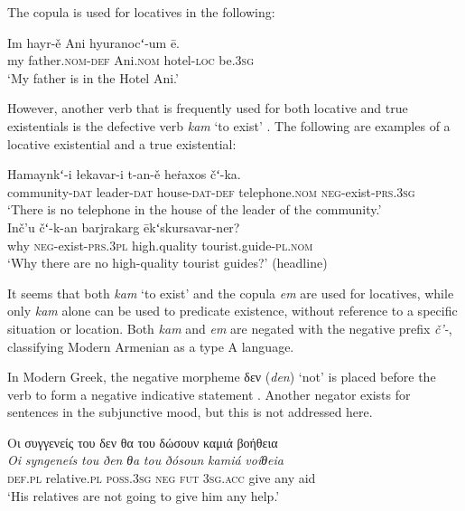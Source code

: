 \documentclass[output=paper,colorlinks,citecolor=brown]{langscibook}
\begin{document}
\begin{paperappendix}
\begin{unindented}
The copula is used for locatives in the following:
%
\begin{exe}\ex \gll Im hayr-ě Ani hyuranocʻ-um ē.  \\
my father.\textsc{nom}-\textsc{def} Ani.\textsc{nom} hotel-\textsc{loc} be.\textsc{3sg} \\
    \glt `My father is in the Hotel Ani.' \parencite[382]{DumTragut2009}
    \end{exe}

However, another verb that is frequently used for both locative and true
existentials is the defective verb \textit{kam} `to exist' \parencite[282]{DumTragut2009}. The following are examples of a locative existential and a true existential:
%
\begin{exe}\ex \gll Hamaynkʻ-i łekavar-i t-an-ě heṙaxos čʻ-ka.  \\
community-\textsc{dat} leader-\textsc{dat} house-\textsc{dat-def} 
telephone.\textsc{nom} \textsc{neg}-exist-\textsc{prs.3sg} \\
    \glt `There is no telephone in the house of the leader of the
community.' \\
\parencite[104--105]{DumTragut2009}
\ex \gll Inč’u čʻ-k-an barjrakarg ēkʻskursavar-ner?  \\
why \textsc{neg}-exist-\textsc{prs.3pl} high.quality tourist.guide-\textsc{pl.nom} \\
    \glt `Why there are no high-quality tourist guides?' (headline)
\parencite[693]{DumTragut2009}
    \end{exe}

It seems that both \textit{kam} `to exist' and the copula \textit{em} are used for locatives, while only \textit{kam} alone can be used to predicate existence, without reference to a specific situation or location. Both \textit{kam} and \textit{em} are negated with the negative prefix \textit{č’-}, classifying Modern Armenian as a type A language. 


In Modern Greek, the negative morpheme δεν
(\textit{den}) `not' is placed before the verb to form a negative
indicative statement \parencite[510]{HoltonMackridge2012}. Another negator exists for sentences in the subjunctive mood, but this is not addressed here. 
%
\begin{exe}\ex \glll
Οι συγγενείς του δεν θα του δώσουν καμιά βοήθεια \\
\textit{Oi} \textit{syngeneís} \textit{tou} \textit{ðen} \textit{θa} \textit{tou} \textit{ðósoun} \textit{kamiá} \textit{voíθeia}\\
\textsc{def.pl}  relative.\textsc{pl} \textsc{poss.3sg} \textsc{neg}  \textsc{fut} \textsc{3sg.acc} give any aid \\
    \glt `His relatives are not going to give him any help.' \parencite[510]{HoltonMackridge2012}
    \end{exe}


\end{unindented}
\end{paperappendix}
\end{document}
